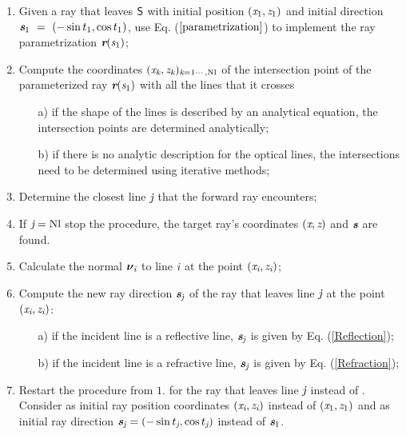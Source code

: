 \begin{enumerate}
 \item Given a ray that leaves $\textsf{S}$ with initial position $(\textit{x}_1, \textit{z}_1)$ and initial direction $\textit{\textbf{s}}_1~=~(-\sin t_1, \cos t_1)$, use Eq. ($\ref{parametrization}$) to implement the ray parametrization $\textit{\textbf{r}}(\textit{s}_1)$;
\item Compute the coordinates $(\textit{x}_{\textit{k}}, \textit{z}_{\textit{k}})_{\textit{k} = 1\cdots, \textrm{Nl}}$ of the intersection point of the parameterized ray $\textit{\textbf{r}}(\textit{s}_1)$ with all the lines that it crosses
\begin{itemize}
\item[a)] if the shape of the lines is described by an analytical equation, the intersection points are determined analytically;
\item[b)] if there is no analytic description for the optical lines, the intersections need to be determined using iterative methods;
\end{itemize}
\item  Determine the closest line $\textit{j}$ that the forward ray encounters;
\item If $\textit{j} = \textrm{Nl}$ stop the procedure, the target ray's coordinates $(\textit{x}, \textit{z})$ and $\textit{\textbf{s}}$ are found.
\item Calculate the normal $\boldsymbol{\nu}_{\textit{i}}$ to line $\textit{i}$ at the point $(\textit{x}_{\textit{i}}, \textit{z}_{\textit{i}})$;
 \item Compute the new ray direction $\textit{\textbf{s}}_{\textit{j}}$ of the ray that leaves line $\textit{j}$ at the point $(\textit{x}_{\textit{i}}, \textit{z}_{\textit{i}})$:
\begin{itemize}
\item[a)] if the incident line is a reflective line, $\textit{\textbf{s}}_{\textit{j}}$ is given by Eq. (\ref{Reflection});
\item[b)] if the incident line is a refractive line, $\textit{\textbf{s}}_{\textit{j}}$ is given by Eq. (\ref{Refraction});
\end{itemize}
\item Restart the procedure from $1.$ for the ray that leaves line $\textit{j}$ instead of . Consider as initial ray position coordinates $(\textit{x}_{\textit{i}}, \textit{z}_{\textit{i}})$ instead of $(\textit{x}_1, \textit{z}_1)$ and as initial ray direction $\textit{\textbf{s}}_{\textit{j}}= (-\sin t_{\textit{j}}, \cos t_{\textit{j}})$ instead of $\textit{\textbf{s}}_1$.
\end{enumerate}
